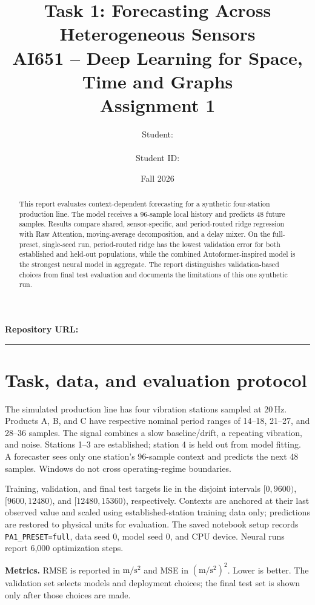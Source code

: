 \documentclass[11pt,a4paper]{article}
\title{\textbf{Task 1: Forecasting Across Heterogeneous Sensors}\\
  \large AI651 -- Deep Learning for Space, Time and Graphs\\
  \normalsize Assignment 1}
\author{Student: \rule{2.7in}{0.4pt} \qquad Student ID: \rule{1.3in}{0.4pt}}
\date{Fall 2026}
\newcommand{\units}{\ensuremath{\mathrm{m/s^2}}}
\begin{document}
\maketitle

\begin{center}
\textbf{Repository URL:} \rule{4.2in}{0.4pt}
\end{center}

\begin{abstract}
This report evaluates context-dependent forecasting for a synthetic four-station production line.
The model receives a 96-sample local history and predicts 48 future samples. Results compare
shared, sensor-specific, and period-routed ridge regression with Raw Attention, moving-average
decomposition, and a delay mixer. On the full-preset, single-seed run, period-routed ridge has the
lowest validation error for both established and held-out populations, while the combined
Autoformer-inspired model is the strongest neural model in aggregate. The report distinguishes
validation-based choices from final test evaluation and documents the limitations of this one
synthetic run.
\end{abstract}

\clearpage
\tableofcontents
\newpage

\section{Task, data, and evaluation protocol}

The simulated production line has four vibration stations sampled at 20\,Hz. Products A, B, and C
have respective nominal period ranges of 14--18, 21--27, and 28--36 samples. The signal combines a
slow baseline/drift, a repeating vibration, and noise. Stations 1--3 are established; station 4 is
held out from model fitting. A forecaster sees only one station's 96-sample context and predicts
the next 48 samples. Windows do not cross operating-regime boundaries.

Training, validation, and final test targets lie in the disjoint intervals
$[0,9600)$, $[9600,12480)$, and $[12480,15360)$, respectively. Contexts are anchored at their
last observed value and scaled using established-station training data only; predictions are
restored to physical units for evaluation. The saved notebook setup records \texttt{PA1\_PRESET=full},
data seed 0, model seed 0, and CPU device. Neural runs report 6,000 optimization steps.

\textbf{Metrics.} RMSE is reported in \units{} and MSE in $(\units)^2$. Lower is better. The
validation set selects models and deployment choices; the final test set is shown only after those
choices are made.
\end{document}
